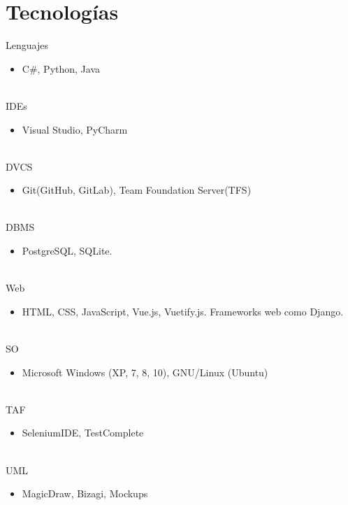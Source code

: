 \documentclass[letterpaper]{twentysecondcv} %
\begin{document}
\section{Tecnologías}
\begin{twenty}
	
	 \twentyitem
    	{Lenguajes}
		{}
        {}
        {}
        {}
        {
        {\begin{itemize}
        \item C\#, Python, Java
		\end{itemize}}
        }
        \\
	\twentyitem
    	{IDEs}
		{}
        {}
        {}
        {}
        {
        {\begin{itemize}
        \item Visual Studio, PyCharm
		\end{itemize}}
        }
        \\
        \twentyitem
    	{DVCS}
		{}
        {}
        {}
        {}
        {
        {\begin{itemize}
        \item Git(GitHub, GitLab), Team Foundation Server(TFS)
		\end{itemize}}
		}
		\\
        \twentyitem
	    {DBMS}
		{}
        {}
        {}
        {}
        {
        {\begin{itemize}
        \item PostgreSQL, SQLite.
		\end{itemize}}
		}
		\\
        \twentyitem
	    {Web}
		{}
        {}
        {}
        {}
        {
        {\begin{itemize}
        \item HTML, CSS, JavaScript, Vue.js, Vuetify.js. Frameworks web como Django.
		\end{itemize}}
		}
		\\
        \twentyitem
	    {SO}
		{}
        {}
        {}
        {}
        {
        {\begin{itemize}
        \item Microsoft Windows (XP, 7, 8, 10), GNU/Linux (Ubuntu)
		\end{itemize}}
		}
		\\
        \twentyitem
	    {TAF}
		{}
        {}
        {}
        {}
        {
        {\begin{itemize}
        \item SeleniumIDE, TestComplete
		\end{itemize}}
		}
		\\
        \twentyitem
	    {UML}
		{}
        {}
        {}
        {}
        {
        {\begin{itemize}
        \item MagicDraw, Bizagi, Mockups
		\end{itemize}}
		}
\end{twenty}
\end{document}
